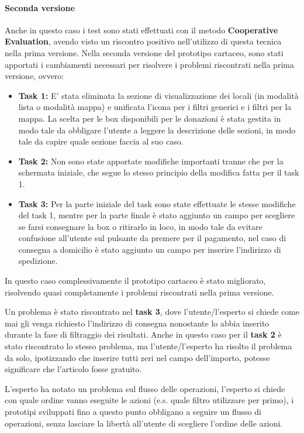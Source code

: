 \documentclass{article}
\begin{document}
\paragraph{Seconda versione}
\mbox{}
\newline
Anche in questo caso i test sono stati effettuati con il metodo \textbf{Cooperative Evaluation}, avendo visto un riscontro positivo nell'utilizzo di questa tecnica nella prima versione.
Nella seconda versione del prototipo cartaceo, sono stati apportati i cambiamenti necessari per risolvere i problemi riscontrati nella prima versione, ovvero:
\begin{itemize}
    \item \textbf{Task 1:} E' stata eliminata la sezione di visualizzazione dei locali (in modalità lista o modalità mappa) e unificata l'icona per i filtri generici e i filtri per la mappa. La scelta per le box disponibili per le donazioni è stata gestita in modo tale da obbligare l'utente a leggere la descrizione delle sezioni, in modo tale da capire quale sezione faccia al suo caso.
    \item \textbf{Task 2:} Non sono state apportate modifiche importanti tranne che per la schermata iniziale, che segue lo stesso principio della modifica fatta per il task 1. 
    \item \textbf{Task 3:} Per la parte iniziale del task sono state effettuate le stesse modifiche del task 1, mentre per la parte finale è stato aggiunto un campo per scegliere se farsi consegnare la box o ritirarlo in loco, in modo tale da evitare confusione all'utente sul pulsante da premere per il pagamento, nel caso di consegna a domicilio è stato aggiunto un campo per inserire l'indirizzo di spedizione.
\end{itemize}

In questo caso complessivamente il prototipo cartaceo è stato migliorato, risolvendo quasi completamente i problemi riscontrati nella prima versione.

Un problema è stato riscontrato nel \textbf{task 3}, dove l'utente/l'esperto si chiede come mai gli venga richiesto l'indirizzo di consegna nonostante lo abbia inserito durante la fase di filtraggio dei risultati.
Anche in questo caso per il \textbf{task 2} è stato riscontrato lo stesso problema, ma l'utente/l'esperto ha risolto il problema da solo, ipotizzando che inserire tutti zeri nel campo dell'importo, potesse significare che l'articolo fosse gratuito.

L'esperto ha notato un problema sul flusso delle operazioni, l'esperto si chiede con quale ordine vanno eseguite le azioni (e.s. quale filtro utilizzare per primo), i prototipi sviluppati fino a questo punto obbligano a seguire un flusso di operazioni, senza lasciare la libertà all'utente di scegliere l'ordine delle azioni.
\end{document}
